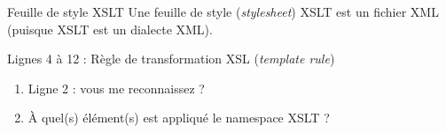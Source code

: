 \begin{frame}{Feuille de style XSLT}
Une feuille de style (\textit{stylesheet}) XSLT est un fichier XML (puisque XSLT est un dialecte XML).

\begin{center}
\begin{minipage}{0.8\textwidth}

\end{minipage}
\end{center}
Lignes 4 \`a 12 : R\`egle de transformation XSL  (\textit{template rule}) \\

\begin{exoblock}
\begin{enumerate}
\item Ligne 2 : vous me reconnaissez ?
\item \`A quel(s) \'el\'ement(s) est appliqu\'e le namespace XSLT ?
\end{enumerate}
\end{exoblock}

\end{frame}

